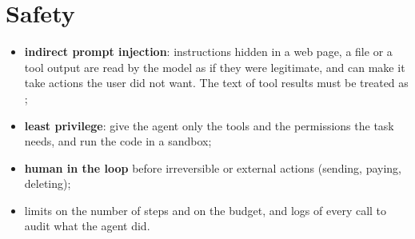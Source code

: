 \section{Safety}
\begin{itemize}
    \item \textbf{indirect prompt injection}: instructions hidden in a web page, a file or a
        tool output are read by the model as if they were legitimate, and can make it take
        actions the user did not want. The text of tool results must be treated as
        ;
    \item \textbf{least privilege}: give the agent only the tools and the permissions the
        task needs, and run the code in a sandbox;
    \item \textbf{human in the loop} before irreversible or external actions (sending, paying,
        deleting);
    \item limits on the number of steps and on the budget, and logs of every call to audit
        what the agent did.
\end{itemize}

